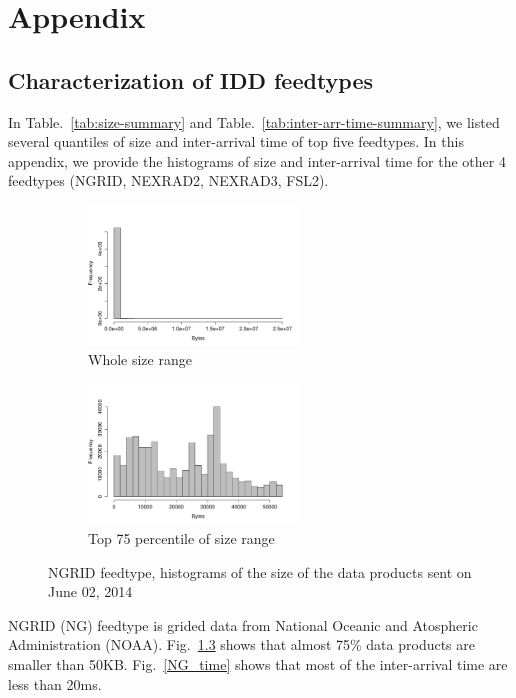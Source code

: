 \chapter{Appendix}

\section{Characterization of IDD feedtypes}

In Table.~\ref{tab:size-summary} and Table.~\ref{tab:inter-arr-time-summary}, we listed several quantiles of size and inter-arrival time of top five feedtypes.
In this appendix, we provide the histograms of size and inter-arrival time for the other 4 feedtypes (NGRID, NEXRAD2, NEXRAD3, FSL2).

\begin{figure}[htb!]
\centering
    \begin{subfigure}{0.5\linewidth}
        \centering
        \includegraphics[width=2.2in]{figures/Size-hist-NGRID0602.pdf}
        \caption{Whole size range}
        \label{NGRID_Size_Whole}
    \end{subfigure}\hfill
    \begin{subfigure}{0.5\linewidth}
	\centering
    \includegraphics[width=2.2in]{figures/Size-hist-NGRID602-TOP75.pdf}
        \caption{Top 75 percentile of size range}
        \label{NGRID_Size_75}
    \end{subfigure}\hfill
    \caption{NGRID feedtype, histograms of the size of the data products sent on June 02, 2014}
    \label{NGRID_Size}
\end{figure}

NGRID (NG) \cite{NGRID} feedtype is grided data from National Oceanic and Atospheric Administration (NOAA). Fig.~\ref{NGRID_Size} shows that almost 75\% data products are smaller than 50KB. Fig.~\ref{NG_time} shows that most of the inter-arrival time are less than 20ms.

